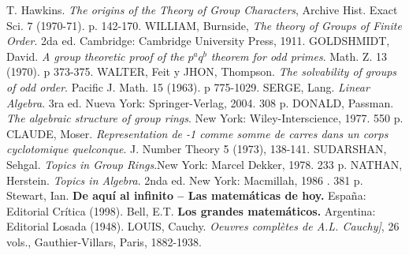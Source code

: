 \begin{thebibliography}{99}
     T. Hawkins. \textit{The origins of the Theory of Group Characters}, Archive Hist. Exact Sci. $7$ (1970-71). p. 142-170.
     WILLIAM, Burnside, \textit{The theory of Groups of Finite Order}. 	2da ed. Cambridge: Cambridge University Press, 1911.
      GOLDSHMIDT, David. \textit{A group theoretic proof of the $p^aq^b$ theorem for odd primes}. Math. Z. 13 (1970). p 373-375.
     WALTER, Feit y JHON, Thompson. \textit{The solvability of groups of odd order}. Pacific J. Math. 15 (1963). p 775-1029.
    SERGE, Lang. \textit{Linear Algebra}. 3ra ed. Nueva York: Springer-Verlag, 2004. 308 p.
     DONALD, Passman. \textit{The algebraic structure of group rings}. New York: Wiley-Interscience, 1977. 550 p.
     CLAUDE, Moser. \textit{Representation de -1 comme somme de carres dans un corps cyclotomique quelconque}. J. Number Theory 5 (1973), 138-141.
     SUDARSHAN, Sehgal.  \textit{Topics in Group Rings}.New York: Marcel Dekker, 1978. 233 p. 
     NATHAN, Herstein. \textit{Topics in Algebra}. 2nda ed.  New York: Macmillah, 1986 . 381 p. 
     Stewart, Ian. \textbf{De aquí al infinito -- Las matemáticas de hoy.} España: Editorial Crítica (1998).
     Bell, E.T. \textbf{Los grandes matemáticos.} Argentina: Editorial Losada (1948).
     LOUIS, Cauchy. \textit{Oeuvres complètes de A.L. Cauchy]}, 26 vols., Gauthier-Villars, Paris, 1882-1938.

\end{thebibliography}
